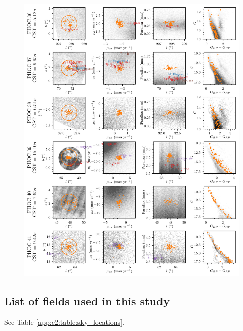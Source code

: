 \begin{figure}[ht]
   \centering
   \includegraphics[width=\textwidth]{fig/c2/fig_new_ocs_6.pdf}
   \caption{}%
   \label{app:c2:fig:new_ocs_6}
\end{figure}






\subsection{List of fields used in this study}\label{app:c2:fields}

See Table \ref{app:c2:table:sky_locations}.

